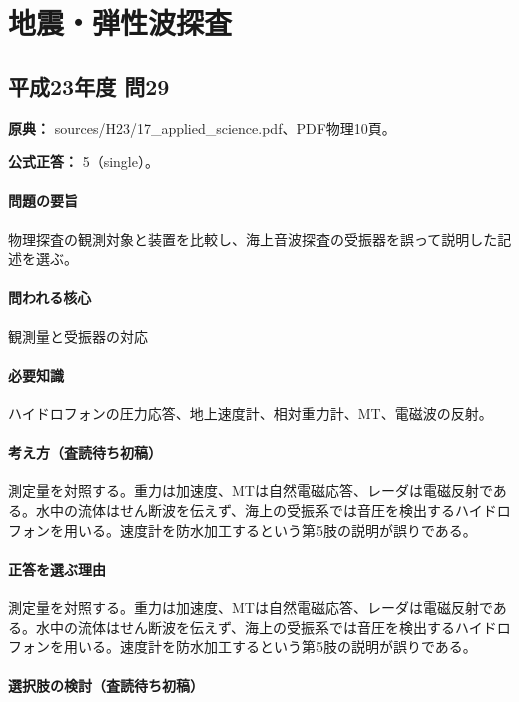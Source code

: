 \section{地震・弾性波探査}

\subsection{平成23年度 問29}
\label{q:h23-reg-applied-29}

\noindent\textbf{原典：} sources/H23/17\_applied\_science.pdf、PDF物理10頁。

\textbf{公式正答：} 5（single）。

\paragraph{問題の要旨} 物理探査の観測対象と装置を比較し、海上音波探査の受振器を誤って説明した記述を選ぶ。

\paragraph{問われる核心} 観測量と受振器の対応

\paragraph{必要知識} ハイドロフォンの圧力応答、地上速度計、相対重力計、MT、電磁波の反射。

\paragraph{考え方（査読待ち初稿）} 測定量を対照する。重力は加速度、MTは自然電磁応答、レーダは電磁反射である。水中の流体はせん断波を伝えず、海上の受振系では音圧を検出するハイドロフォンを用いる。速度計を防水加工するという第5肢の説明が誤りである。

\paragraph{正答を選ぶ理由} 測定量を対照する。重力は加速度、MTは自然電磁応答、レーダは電磁反射である。水中の流体はせん断波を伝えず、海上の受振系では音圧を検出するハイドロフォンを用いる。速度計を防水加工するという第5肢の説明が誤りである。

\paragraph{選択肢の検討（査読待ち初稿）}\mbox{}\par

